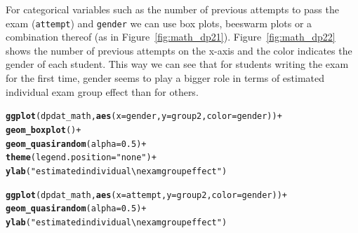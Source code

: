 \documentclass{josr}\usepackage[]{graphicx}\usepackage[]{color}
\makeatletter
\newcommand{\hlnum}[1]{\textcolor[rgb]{0.686,0.059,0.569}{#1}}%
\newcommand{\hlstr}[1]{\textcolor[rgb]{0.192,0.494,0.8}{#1}}%
\newcommand{\hlopt}[1]{\textcolor[rgb]{0,0,0}{#1}}%
\newcommand{\hlstd}[1]{\textcolor[rgb]{0.345,0.345,0.345}{#1}}%
\newcommand{\hlkwc}[1]{\textcolor[rgb]{0.333,0.667,0.333}{#1}}%
\newcommand{\hlkwd}[1]{\textcolor[rgb]{0.737,0.353,0.396}{\textbf{#1}}}%
\newenvironment{kframe}{%
 \def\at@end@of@kframe{}%
 \ifinner\ifhmode%
  \def\at@end@of@kframe{\end{minipage}}%
  \begin{minipage}{\columnwidth}%
 \fi\fi%
 \def\FrameCommand##1{\hskip\@totalleftmargin \hskip-\fboxsep
 \colorbox{shadecolor}{##1}\hskip-\fboxsep
     \hskip-\linewidth \hskip-\@totalleftmargin \hskip\columnwidth}%
 \MakeFramed {\advance\hsize-\width
   \@totalleftmargin\z@ \linewidth\hsize
   \@setminipage}}%
 {\par\unskip\endMakeFramed%
 \at@end@of@kframe}
\newenvironment{knitrout}{}{} %
\newcommand{\new}[1]{{\color{blue} #1}}
\makeatother
\begin{document}
\new{
For categorical variables such as the number of previous attempts to pass the
exam (\texttt{\hlstd{attempt}}) and \texttt{\hlstd{gender}} we can use box plots,
\new{beeswarm} plots or a combination thereof (as in
Figure~\ref{fig:math_dp21}). Figure~\ref{fig:math_dp22} shows the number of
previous attempts on the x-axis and the color indicates the gender of each
student.  This way we can see that for students writing the exam for the first
time, gender seems to play a bigger role in terms of estimated individual exam
group effect than for others.
}
\begin{knitrout}
\color{fgcolor}\begin{kframe}
\begin{alltt}
\hlkwd{ggplot}\hlstd{(dpdat_math,} \hlkwd{aes}\hlstd{(}\hlkwc{x} \hlstd{= gender,} \hlkwc{y} \hlstd{= group2,} \hlkwc{color} \hlstd{= gender))} \hlopt{+}
  \hlkwd{geom_boxplot}\hlstd{()} \hlopt{+}
  \hlkwd{geom_quasirandom}\hlstd{(}\hlkwc{alpha} \hlstd{=} \hlnum{0.5}\hlstd{)} \hlopt{+}
  \hlkwd{theme}\hlstd{(}\hlkwc{legend.position} \hlstd{=} \hlstr{"none"}\hlstd{)} \hlopt{+}
  \hlkwd{ylab}\hlstd{(}\hlstr{"estimated individual\textbackslash{}nexam group effect"}\hlstd{)}

\hlkwd{ggplot}\hlstd{(dpdat_math,} \hlkwd{aes}\hlstd{(}\hlkwc{x} \hlstd{= attempt,} \hlkwc{y} \hlstd{= group2,} \hlkwc{color} \hlstd{= gender))} \hlopt{+}
  \hlkwd{geom_quasirandom}\hlstd{(}\hlkwc{alpha} \hlstd{=} \hlnum{0.5}\hlstd{)} \hlopt{+}
  \hlkwd{ylab}\hlstd{(}\hlstr{"estimated individual\textbackslash{}nexam group effect"}\hlstd{)}
\end{alltt}
\end{kframe}\begin{figure}

{\centering {}

}
\end{figure}
\end{knitrout}
\end{document}
